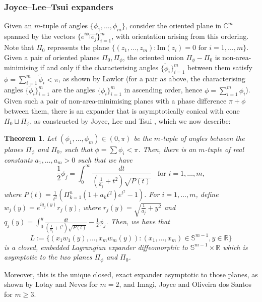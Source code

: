 \documentclass[10pt, a4paper]{article}
\theoremstyle{plain}%
\newtheorem{theorem}{Theorem}[section]
\theoremstyle{definition}
\numberwithin{figure}{section}
\numberwithin{equation}{section}
\newcommand{\bR}{\mathbb{R}}
\newcommand{\bC}{\mathbb{C}}
\newcommand{\bS}{\mathbb{S}}
\begin{document}
\subsubsection{Joyce--Lee--Tsui expanders}
Given an $m$-tuple of angles $\{\phi_1,\dots,\phi_m\}$, consider the oriented plane in $\bC^m$ spanned by the vectors $\{e^{i\phi_j}\overrightarrow{e_j}\}_{i=1}^m$, with orientation arising from this ordering. Note that $\Pi_0$ represents the plane $\{(z_1,\dots,z_m) : \mathrm{Im}(z_i)=0 \textrm{ for } i=1,\dots,m \}.$
Given a pair of oriented planes $\Pi_0,\Pi_\phi$, the oriented union $\Pi_\phi - \Pi_0$ is non-area-minimising if and only if the characterising angles $\{\tilde{\phi}_i\}_{i=1}^m$ between them satisfy $\phi = \sum_{i=1}^m\tilde{\phi}_i< \pi$, as shown by Lawlor \cite{Law89} (for a pair as above, the characterising angles $\{\tilde{\phi}_i\}_{i=1}^m$ are the angles $\{\phi_i\}_{i=1}^m$ in ascending order, hence $\phi = \sum_{i=1}^m\phi_i$). Given such a pair of non-area-minimising planes with a phase difference $\pi+\phi $ between them, there is an expander that is asymptotically conical with cone $\Pi_0\sqcup \Pi_\phi$, as constructed by Joyce, Lee and Tsui \cite{JLT10}, which we now describe:

\begin{theorem}
	Let $(\phi_1,\dots,\phi_m) \in (0,\pi)$ be the $m$-tuple of angles between the planes $\Pi_\phi$ and $\Pi_0$, such that $\phi=\sum{\phi_i} < \pi$. Then, there is an $m$-tuple of real constants $a_1,\dots,a_m> 0 $ such that we have \[
	\frac{1}{2}\phi_j = \int_0^\infty\frac{dt}{(\frac{1}{a_j}+t^2)\sqrt{P(t)}} \;\;\textrm{ for } i= 1,\dots,m,
	\]
	where
	$P(t) = \frac{1}{t^2}(\Pi_{k=1}^n (1+ a_k t^2)e^{t^2}-1)$. For $i=1,\dots,m$, define $w_j(y)=e^{iq_j(y)}r_j(y)$, where $r_j(y) = \sqrt{\frac{1}{a_j}+y^2}$ and $q_j(y) = \int_0^y\frac{dt}{(\frac{1}{a_j}+t^2)\sqrt{P(t)}} - \frac{1}{2}{\phi}_j$. Then, we have that \[
	L:= \{(x_1w_1(y),\dots,x_mw_m(y)) : (x_1,\dots,x_m)\in \mathbb{S}^{m-1}, y\in \bR \}
	\]
	is a closed, embedded Lagrangian expander diffeomorphic to $\bS^{m-1}\times\bR$ which is asymptotic to the two planes $\Pi_\phi$ and $\Pi_0$.
	
\end{theorem}
Moreover, this is the unique closed, exact expander asymptotic to those planes, as shown by Lotay and Neves \cite{LN13} for $m=2$, and Imagi, Joyce and Oliveira dos Santos \cite{IJO16} for $m\geq 3$. 
\end{document}
